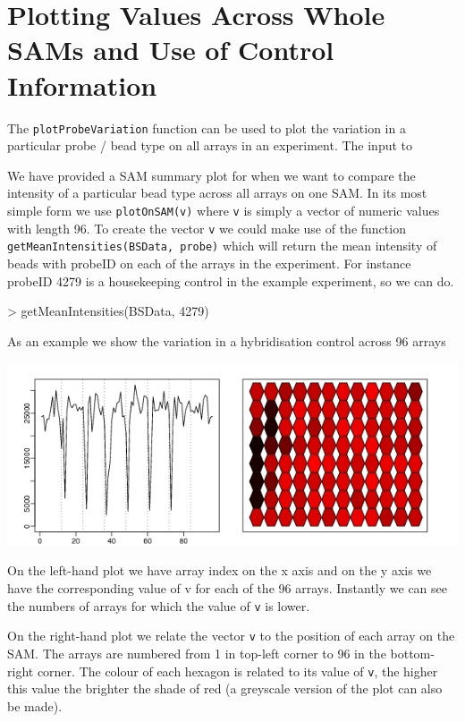 \documentclass[a4paper]{article}
\newcommand{\Robject}[1]{{\texttt{#1}}}
\newcommand{\Rfunction}[1]{{\texttt{#1}}}
\begin{document}
\section{Plotting Values Across Whole SAMs and Use of Control Information}
\label{plotting_across_arrays}

The \Rfunction{plotProbeVariation} function can be used to plot the
variation in a particular probe / bead type on all arrays in an
experiment. The input to



We have provided a SAM summary plot for when we want to compare the intensity of a particular bead type across all arrays on one SAM. In its most simple form we use \Rfunction{plotOnSAM(v)} where \Robject{v}
is simply a vector of numeric values with length 96. To create the vector \Robject{v} we could make use of the function \Rfunction{getMeanIntensities(BSData, probe)} which will return the mean intensity of beads with probeID on each of the
arrays in the experiment. For instance probeID 4279 is a housekeeping control in the example experiment, so we can do.

\begin{Schunk}
\begin{Sinput}
> getMeanIntensities(BSData, 4279)
\end{Sinput}
\end{Schunk}

As an example we show the variation in a hybridisation control across 96 arrays

\includegraphics{testpdf2.jpg}

On the left-hand plot we have array index on the x axis and on the y axis we have the corresponding value of v for each of the 96 arrays. Instantly we can see the numbers of arrays for which the value of \Robject{v} is lower.

On the right-hand plot we relate the vector \Robject{v} to the position of each array on the SAM. The arrays are numbered from 1 in top-left corner to 96 in the bottom-right corner. The colour of each hexagon is related to its value of \Robject{v}, the higher this value the brighter the shade of red (a greyscale version of the plot can also be made). 
\end{document}
